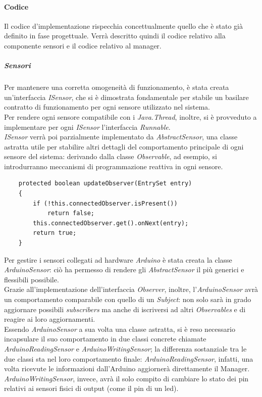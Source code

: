 \documentclass[12pt]{article}
\begin{document}
\paragraph{Codice}
Il codice d'implementazione rispecchia concettualmente quello che è stato già definito in fase progettuale. Verrà descritto quindi il codice relativo alla componente sensori e il codice relativo al manager.
\subparagraph{Sensori}
Per mantenere una corretta omogeneità di funzionamento, è stata creata un'interfaccia \textit{ISensor}, che si è dimostrata fondamentale per stabile un basilare contratto di funzionamento per ogni sensore utilizzato nel sistema.\\
Per rendere ogni sensore compatibile con i \textit{Java.Thread}, inoltre, si è provveduto a implementare per ogni \textit{ISensor} l'interfaccia \textit{Runnable}. \\
\textit{ISensor} verrà poi parzialmente implementato da \textit{AbstractSensor}, una classe astratta utile per stabilire altri dettagli del comportamento principale di ogni sensore del sistema: derivando dalla classe \textit{Observable}, ad esempio, si introdurranno meccanismi di programmazione reattiva in ogni sensore.\\
\begin{lstlisting}
	protected boolean updateObserver(EntrySet entry)
	{
		if (!this.connectedObserver.isPresent())
			return false;
		this.connectedObserver.get().onNext(entry);
		return true;
	}
\end{lstlisting}
Per gestire i sensori collegati ad hardware \textit{Arduino} è stata creata la classe \textit{ArduinoSensor}: ciò ha permesso di rendere gli \textit{AbstractSensor} il più generici e flessibili possibile.\\
Grazie all'implementazione dell'interfaccia \textit{Observer}, inoltre, l'\textit{ArduinoSensor} avrà un comportamento comparabile con quello di un \textit{Subject}: non solo sarà in grado aggiornare possibili \textit{subscribers} ma anche di iscriversi ad altri \textit{Observables} e di reagire ai loro aggiornamenti.\\
Essendo \textit{ArduinoSensor} a sua volta una classe astratta, si è reso necessario incapsulare il suo comportamento in due classi concrete chiamate \textit{ArduinoReadingSensor} e \textit{ArduinoWritingSensor}; la differenza sostanziale tra le due classi sta nel loro comportamento finale: \textit{ArduinoReadingSensor}, infatti, una volta ricevute le informazioni dall'Arduino aggiornerà direttamente il Manager.\\ \textit{ArduinoWritingSensor}, invece, avrà il solo compito di cambiare lo stato dei pin relativi ai sensori fisici di output (come il pin di un led).\\
\end{document}
